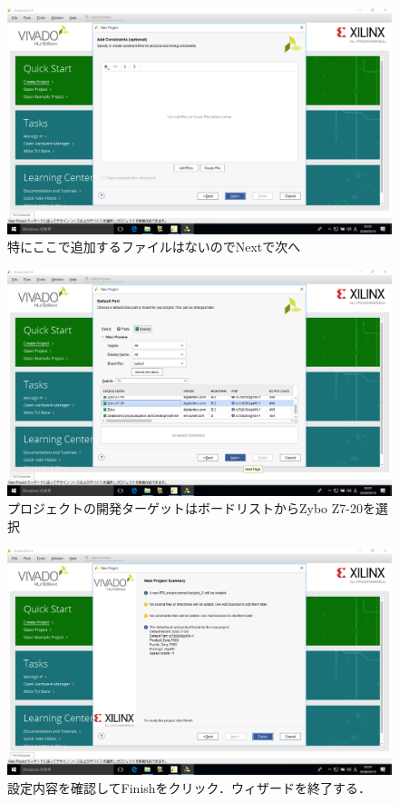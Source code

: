 \documentclass[a4paper,dvipdfmx]{jsarticle}
\begin{document}
 \begin{figure}[H]
  \begin{center}
   \includegraphics[width=.8\textwidth]{chapter08_figures/VirtualBox_Windows10_19_03_2018_23_23_39.png}
  \end{center}
  \caption{特にここで追加するファイルはないのでNextで次へ}
 \end{figure}

 \begin{figure}[H]
  \begin{center}
   \includegraphics[width=.8\textwidth]{chapter08_figures/VirtualBox_Windows10_19_03_2018_23_23_52.png}
  \end{center}
  \caption{プロジェクトの開発ターゲットはボードリストからZybo Z7-20を選択}
 \end{figure}

 \begin{figure}[H]
  \begin{center}
   \includegraphics[width=.8\textwidth]{chapter08_figures/VirtualBox_Windows10_19_03_2018_23_23_58.png}
  \end{center}
  \caption{設定内容を確認してFinishをクリック．ウィザードを終了する．}
 \end{figure}
\end{document}
